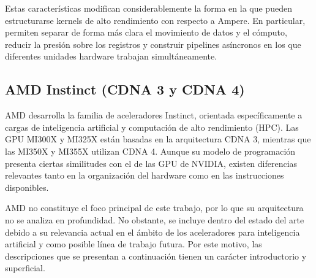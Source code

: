 \begin{itemize}
\end{itemize}

Estas características modifican considerablemente la forma en la que pueden estructurarse kernels de alto rendimiento con respecto a Ampere. En particular, permiten separar de forma más clara el movimiento de datos y el cómputo, reducir la presión sobre los registros y construir pipelines asíncronos en los que diferentes unidades hardware trabajan simultáneamente.

\subsection{AMD Instinct (CDNA 3 y CDNA 4)}

AMD desarrolla la familia de aceleradores Instinct, orientada específicamente a cargas de inteligencia artificial y computación de alto rendimiento (HPC). Las GPU MI300X y MI325X están basadas en la arquitectura CDNA 3, mientras que las MI350X y MI355X utilizan CDNA 4. Aunque su modelo de programación presenta ciertas similitudes con el de las GPU de NVIDIA, existen diferencias relevantes tanto en la organización del hardware como en las instrucciones disponibles.

AMD no constituye el foco principal de este trabajo, por lo que su arquitectura no se analiza en profundidad. No obstante, se incluye dentro del estado del arte debido a su relevancia actual en el ámbito de los aceleradores para inteligencia artificial y como posible línea de trabajo futura. Por este motivo, las descripciones que se presentan a continuación tienen un carácter introductorio y superficial.

